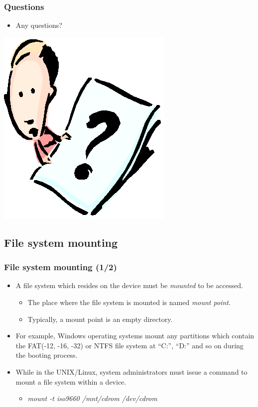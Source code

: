 \documentclass[CJKutf8,xcolor=pdftex,dvipsnames,table]{beamer}
\begin{document}
\begin{CJK*}{UTF8}{song}
  \begin{frame}
    \frametitle{Questions}
    \begin{itemize}
    \item Any questions?
    \end{itemize}
    \begin{center}
      \includegraphics[scale=.5]{question}
    \end{center}
  \end{frame}

  \subsection{File system mounting}

  \begin{frame}
    \frametitle{File system mounting (1/2)} \pause
    \begin{itemize}
    \item A file system which resides on the device must be \emph{mounted} to be accessed. \pause
      \begin{itemize}
      \item The place where the file system is mounted is named \emph{mount point}.\pause
      \item Typically, a mount point is an empty directory. \pause
      \end{itemize}
    \item For example, Windows operating systems mount any partitions which contain the FAT(-12, -16, -32) or NTFS file system at ``C:'', ``D:'' and so on during the booting process. \pause
    \item While in the UNIX/Linux, system administrators must issue a command to mount a file system within a device. \pause
      \begin{itemize}
      \item \emph{mount -t iso9660 /mnt/cdrom /dev/cdrom}
      \end{itemize}
    \end{itemize}
  \end{frame}


\end{CJK*}
\end{document}
